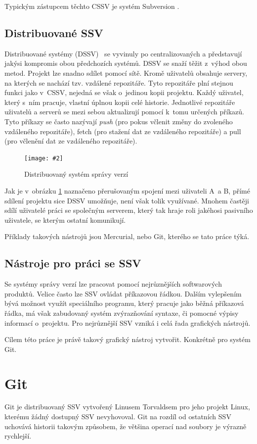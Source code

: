 \documentclass[
  biblatex,
  glossaries,
  index
]{kidiplom}
\newcommand{\pic}[4]{
\begin{figure}[h]
\centering
\texttt{[image: \#2]}
\caption{#3}
\label{fig:#4}
\end{figure}}
\begin{document}
Typickým zástupcem těchto CSSV je systém Subversion \cite{svn}.

\subsection{Distribuované SSV}
Distribuované systémy (DSSV)~\cite{otte} se vyvinuly po centralizovaných a představují 
jakýsi kompromis obou předchozích systémů. DSSV se snaží těžit z~výhod obou 
metod. Projekt lze snadno sdílet pomocí sítě. Kromě uživatelů obsahuje 
servery, na kterých se nachází tzv. vzdálené repozitáře. Tyto repozitáře 
plní stejnou funkci jako v~CSSV, nejedná se však o~jedinou kopii projektu.
Každý uživatel, který s~ním pracuje, vlastní úplnou kopii
celé historie. Jednotlivé repozitáře uživatelů a serverů se mezi sebou 		
aktualizují pomocí k~tomu určených příkazů. Tyto příkazy se často nazývají
{\it push} (pro pokus včlenit změny do zvoleného vzdáleného repozitáře), fetch
(pro stažení dat ze vzdáleného repozitáře) a pull (pro včlenění dat ze 
vzdáleného repozitáře).

\pic{10cm}{distributed.png}{Distribuovaný systém správy verzí}{distributed}

Jak je v~obrázku \ref{fig:distributed} \cite{gitreference} naznačeno přerušovaným spojení mezi uživateli A~a B, přímé sdílení projektu sice DSSV umožňuje, není však tolik využívané. Mnohem častěji sdílí uživatelé práci se společným serverem, který tak hraje roli jakéhosi pasivního uživatele, se kterým ostatní komunikují.

Příklady takových nástrojů jsou Mercurial\cite{mercurial}, nebo Git\cite{git}, kterého se
tato práce týká.

\subsection{Nástroje pro práci se SSV}
Se systémy správy verzí lze pracovat pomocí nejrůznějších softwarových produktů. Velice často lze SSV ovládat příkazovou řádkou. Dalším vylepšením bývá možnost využít speciálního programu, který pracuje jako běžná příkazová řádka, má však zabudovaný systém zvýrazňování syntaxe, či pomocné výpisy informací o~projektu. Pro nejrůznější SSV vzniká i celá řada grafických nástrojů.

Cílem této práce je právě takový grafický nástroj vytvořit. Konkrétně pro systém Git.

\section{Git}
Git je distribuovaný SSV vytvořený Linusem Torvaldsem pro jeho projekt Linux, kterému žádný dostupný SSV nevyhovoval. Git na rozdíl od ostatních SSV uchovává historii   takovým způsobem, že většina operací nad soubory je výrazně rychlejší.
\end{document}
